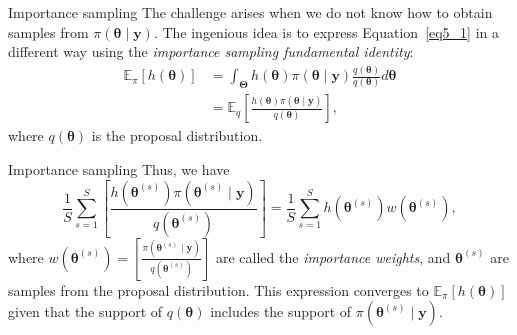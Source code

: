 \documentclass[12pt, compress]{beamer}
\begin{document}
\begin{frame}{Importance sampling}
The challenge arises when we do not know how to obtain samples from $\pi(\bm{\theta}\mid \bm{y})$. The ingenious idea is to express Equation~\ref{eq5_1} in a different way using the \textit{importance sampling fundamental identity}:
\begin{align}\label{eq5_3}
	\mathbb{E}_{\pi}[h(\bm{\theta})]&=\int_{\bm{\Theta}} h(\bm{\theta}) \pi(\bm{\theta}\mid \bm{y})\frac{q(\bm{\theta})}{q(\bm{\theta})}d\bm{\theta}\nonumber\\
	&=\mathbb{E}_{q}\left[\frac{h(\bm{\theta})\pi(\bm{\theta}\mid \bm{y})}{q(\bm{\theta})}\right],
\end{align}   
where $q(\bm{\theta})$ is the proposal distribution.
\end{frame}

\begin{frame}{Importance sampling}
Thus, we have $$\frac{1}{S}\sum_{s=1}^S \left[\frac{h(\bm{\theta}^{(s)})\pi(\bm{\theta}^{(s)}\mid \bm{y})}{q(\bm{\theta}^{(s)})}\right]= \frac{1}{S}\sum_{s=1}^S h(\bm{\theta}^{(s)})w(\bm{\theta}^{(s)}),$$ where $w(\bm{\theta}^{(s)})= \left[\frac{\pi(\bm{\theta}^{(s)}\mid \bm{y})}{q(\bm{\theta}^{(s)})}\right]$ are called the \textit{importance weights}, and $\bm{\theta}^{(s)}$ are samples from the proposal distribution. This expression converges to $\mathbb{E}_{\pi}[h(\bm{\theta})]$ given that the support of $q(\bm{\theta})$ includes the support of $\pi(\bm{\theta}^{(s)}\mid \bm{y})$.
\end{frame}
\end{document}
